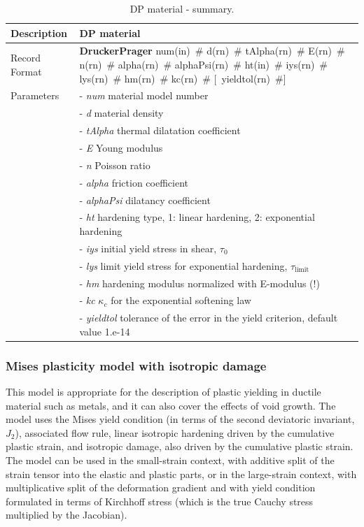 \documentclass[a4paper]{article}
\newcommand{\descitem}[1]{{\noindent \bf #1}}
\newcommand{\elemparam}[2]{{{#1\tiny (#2)}~\#}}
\newcommand{\optelemparam}[2]{[{~\elemparam{#1}{#2}}]}
\newcommand{\param}[1]{{\it #1}}
\begin{document}
\begin{table}[!htb]
\begin{tabular}{|l|p{9cm}|}
\hline
Description & DP material\\
\hline
Record Format & \descitem{DruckerPrager} \elemparam{num}{in}
\elemparam{d}{rn} \elemparam{tAlpha}{rn} \elemparam{E}{rn} \elemparam{n}{rn}
\elemparam{alpha}{rn} \elemparam{alphaPsi}{rn} \elemparam{ht}{in}
\elemparam{iys}{rn} \elemparam{lys}{rn} \elemparam{hm}{rn} \elemparam{kc}{rn} \optelemparam{yieldtol}{rn} \\
Parameters &- \param{num} material model number\\
&- \param{d} material density\\
&- \param{tAlpha} thermal dilatation coefficient\\
&- \param{E} Young modulus\\
&- \param{n} Poisson ratio\\
&- \param{alpha} friction coefficient\\
&- \param{alphaPsi}  dilatancy coefficient\\
&- \param{ht} hardening type, 1: linear hardening, 2: exponential
hardening\\
&- \param{iys} initial yield stress in shear, $\tau_0$\\
&- \param{lys} limit yield stress for exponential hardening, $\tau_{\mathrm{limit}}$\\
&- \param{hm} hardening modulus normalized with E-modulus (!)\\
&- \param{kc} $\kappa_c$ for the exponential softening law\\
&- \param{yieldtol} tolerance of the error in the yield criterion, default value
1.e-14\\
\hline
\end{tabular}
\caption{DP material - summary.}
\label{DP_table}
\end{table}




\subsubsection{Mises plasticity model with isotropic damage}
\label{sec:misplast}

This model is appropriate for the description of plastic yielding in ductile material such as metals, and it can also cover the effects of void growth.
The model uses the Mises yield condition (in terms of the second deviatoric invariant, $J_2$),
associated flow rule, linear isotropic hardening driven by the cumulative plastic strain,
and isotropic damage, also driven by the cumulative plastic strain. The model can be used in the small-strain context, with additive split 
of the strain tensor into the elastic and plastic parts, or in the large-strain context,
with multiplicative split of the deformation gradient and with yield condition formulated in terms of Kirchhoff stress (which is the true Cauchy stress multiplied by the Jacobian).
\end{document}
